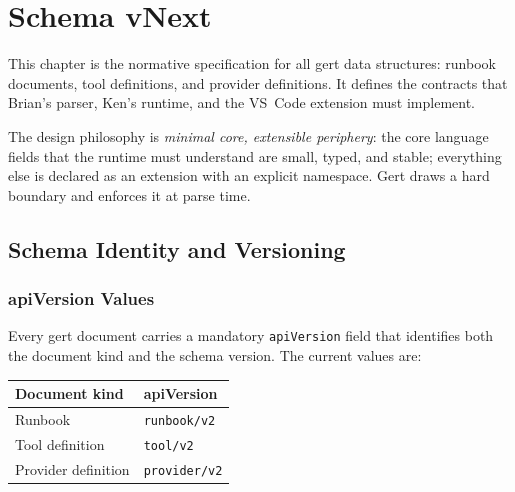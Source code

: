 
\chapter{Schema vNext}

\label{ch:schema}

This chapter is the normative specification for all gert data structures:
runbook documents, tool definitions, and provider definitions.
It defines the contracts that Brian's
parser, Ken's runtime, and the VS~Code extension must implement.

The design philosophy is \emph{minimal core, extensible periphery}: the core
language fields that the runtime must understand are small, typed, and stable;
everything else is declared as an extension with an explicit namespace.  Gert
draws a hard boundary and enforces it at parse time.

\section{Schema Identity and Versioning}
\label{sec:schema-identity}

\subsection{apiVersion Values}
\label{subsec:apiversion}

Every gert document carries a mandatory \texttt{apiVersion} field that
identifies both the document kind and the schema version.  The current values are:

\begin{center}
\begin{tabular}{ll}
\hline
\textbf{Document kind} & \textbf{apiVersion} \\
\hline
Runbook                & \texttt{runbook/v2} \\
Tool definition        & \texttt{tool/v2}   \\
Provider definition    & \texttt{provider/v2} \\
\hline
\end{tabular}
\end{center}


